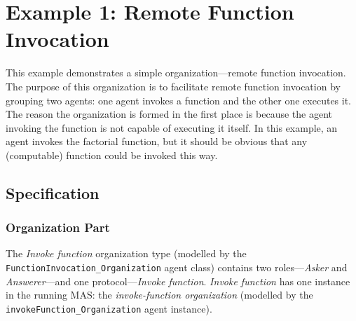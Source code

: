 
\section{Example 1: Remote Function Invocation}

This example demonstrates a simple organization---remote function invocation.
The purpose of this organization is to facilitate remote function invocation by grouping two agents: one agent invokes a function and the other one executes it.
The reason the organization is formed in the first place is because the agent invoking the function is not capable of executing it itself.
In this example, an agent invokes the factorial function, but it should be obvious that any (computable) function could be invoked this way.

\subsection*{Specification}

\subsubsection*{Organization Part}

The \textit{Invoke function} organization type (modelled by the \texttt{FunctionInvocation\_Organization} agent class) contains two roles---\textit{Asker} and \textit{Answerer}---and one protocol---\textit{Invoke function}.
\textit{Invoke function} has one instance in the running MAS: the \textit{invoke-function organization} (modelled by the \texttt{invokeFunction\_Organization} agent instance).

